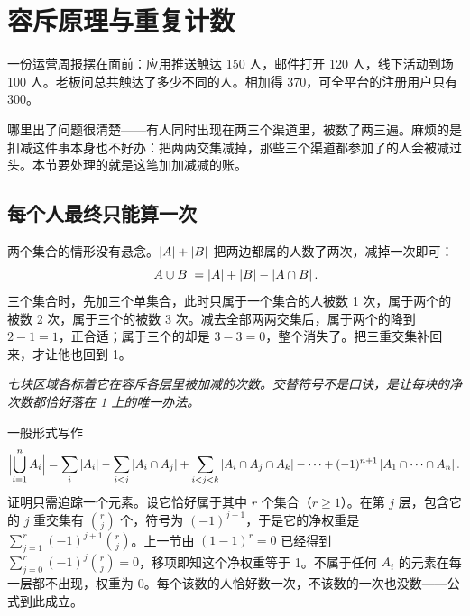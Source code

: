 \section{容斥原理与重复计数}
\label{sec:04-Discrete-Mathematics/01-Combinatorics/04}

一份运营周报摆在面前：应用推送触达 150 人，邮件打开 120 人，线下活动到场 100 人。老板问总共触达了多少不同的人。相加得 370，可全平台的注册用户只有 300。

哪里出了问题很清楚——有人同时出现在两三个渠道里，被数了两三遍。麻烦的是扣减这件事本身也不好办：把两两交集减掉，那些三个渠道都参加了的人会被减过头。本节要处理的就是这笔加加减减的账。

\subsection{每个人最终只能算一次}

两个集合的情形没有悬念。\(\left|A\right|+\left|B\right|\) 把两边都属的人数了两次，减掉一次即可：
\[
\left|A\cup B\right|=\left|A\right|+\left|B\right|-\left|A\cap B\right|.
\]
三个集合时，先加三个单集合，此时只属于一个集合的人被数 1 次，属于两个的被数 2 次，属于三个的被数 3 次。减去全部两两交集后，属于两个的降到 \(2-1=1\)，正合适；属于三个的却是 \(3-3=0\)，整个消失了。把三重交集补回来，才让他也回到 1。

\begin{center}

\emph{七块区域各标着它在容斥各层里被加减的次数。交替符号不是口诀，是让每块的净次数都恰好落在 1 上的唯一办法。}
\end{center}

一般形式写作
\[
\Bigl|\bigcup_{i=1}^n A_i\Bigr|
=\sum_{i}\left|A_i\right|-\sum_{i<j}\left|A_i\cap A_j\right|+\sum_{i<j<k}\left|A_i\cap A_j\cap A_k\right|-\cdots+(-1)^{n+1}\left|A_1\cap\cdots\cap A_n\right|.
\]
证明只需追踪一个元素。设它恰好属于其中 \(r\) 个集合（\(r\ge1\)）。在第 \(j\) 层，包含它的 \(j\) 重交集有 \(\binom rj\) 个，符号为 \((-1)^{j+1}\)，于是它的净权重是 \(\sum_{j=1}^r(-1)^{j+1}\binom rj\)。上一节由 \((1-1)^r=0\) 已经得到 \(\sum_{j=0}^r(-1)^j\binom rj=0\)，移项即知这个净权重等于 1。不属于任何 \(A_i\) 的元素在每一层都不出现，权重为 0。每个该数的人恰好数一次，不该数的一次也没数——公式到此成立。

